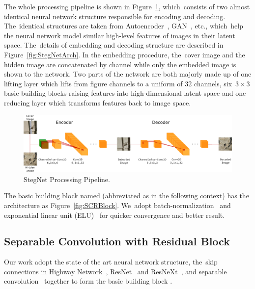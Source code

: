 \documentclass[futureinternet,article,accept,moreauthors,pdftex,10pt,a4paper]{Definitions/mdpi}
\begin{document}
The whole processing pipeline is shown in Figure~\ref{fig:pipeline}, which~consists of two almost identical neural network structure responsible for encoding and decoding. The~identical structures are taken from Autoencoder~\cite{hinton1994autoencoders}, GAN~\cite{GAN}, etc., which~help the neural network model similar high-level features of images in their latent space. The~details of embedding and decoding structure are described in Figure~\ref{fig:StegNetArch}. In the embedding procedure, the~cover image and the hidden image are concatenated by channel while only the embedded image is shown to the network. Two parts of the network are both majorly made up of one lifting layer which lifts from figure channels to a uniform of 32 channels, six~\(3 \times 3\) basic building blocks raising features into high-dimensional latent space and one reducing layer which transforms features back to image space.

\begin{figure}[H]
  \centering
  \includegraphics[width=\linewidth]{pipeline/Pipeline-multicolor}
  \vspace{-12pt}
  \caption{StegNet Processing Pipeline.}%
\label{fig:pipeline}
\end{figure}


The basic building block named  (abbreviated as  in the following context) has the architecture as Figure~\ref{fig:SCRBlock}. We~adopt batch-normalization~\cite{batchnorm} and exponential linear unit (ELU)~\cite{elu} for quicker convergence and better result.

\subsection{Separable Convolution with Residual Block}%
\label{ssec:residualsepconv}

Our work adopt the state of the art neural network structure, the~skip connections in Highway Network~\cite{highway}, ResNet~\cite{resnet} and ResNeXt~\cite{resnext}, and separable convolution~\cite{sepconv} together to form the basic building block .
\end{document}
